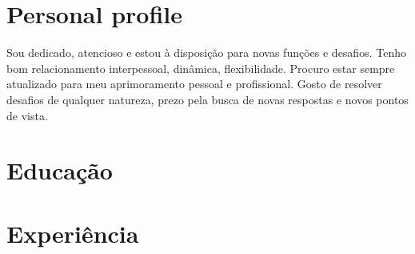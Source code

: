 \documentclass[letterpaper]{twentysecondcv} %
\begin{document}
\makeprofile %

\section{Personal profile}

Sou dedicado, atencioso e estou à disposição para novas funções e desafios. Tenho bom relacionamento interpessoal, dinâmica, flexibilidade. Procuro estar sempre atualizado para meu aprimoramento pessoal e profissional. Gosto de resolver desafios de qualquer natureza, prezo pela busca de novas respostas e novos pontos de vista. \vspace{2mm}

\section{Educação}



\section{Experiência}
\end{document}
